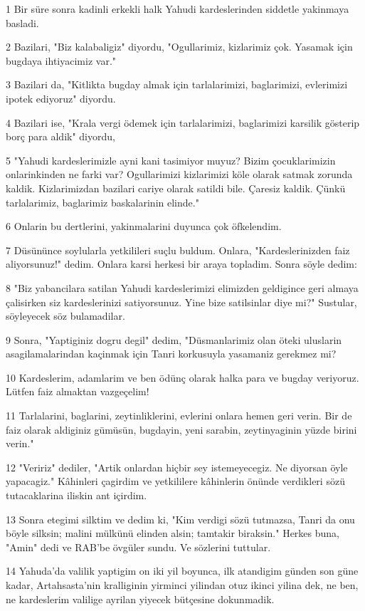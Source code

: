 \par 1 Bir süre sonra kadinli erkekli halk Yahudi kardeslerinden siddetle yakinmaya basladi.
\par 2 Bazilari, "Biz kalabaligiz" diyordu, "Ogullarimiz, kizlarimiz çok. Yasamak için bugdaya ihtiyacimiz var."
\par 3 Bazilari da, "Kitlikta bugday almak için tarlalarimizi, baglarimizi, evlerimizi ipotek ediyoruz" diyordu.
\par 4 Bazilari ise, "Krala vergi ödemek için tarlalarimizi, baglarimizi karsilik gösterip borç para aldik" diyordu,
\par 5 "Yahudi kardeslerimizle ayni kani tasimiyor muyuz? Bizim çocuklarimizin onlarinkinden ne farki var? Ogullarimizi kizlarimizi köle olarak satmak zorunda kaldik. Kizlarimizdan bazilari cariye olarak satildi bile. Çaresiz kaldik. Çünkü tarlalarimiz, baglarimiz baskalarinin elinde."
\par 6 Onlarin bu dertlerini, yakinmalarini duyunca çok öfkelendim.
\par 7 Düsününce soylularla yetkilileri suçlu buldum. Onlara, "Kardeslerinizden faiz aliyorsunuz!" dedim. Onlara karsi herkesi bir araya topladim. Sonra söyle dedim:
\par 8 "Biz yabancilara satilan Yahudi kardeslerimizi elimizden geldigince geri almaya çalisirken siz kardeslerinizi satiyorsunuz. Yine bize satilsinlar diye mi?" Sustular, söyleyecek söz bulamadilar.
\par 9 Sonra, "Yaptiginiz dogru degil" dedim, "Düsmanlarimiz olan öteki uluslarin asagilamalarindan kaçinmak için Tanri korkusuyla yasamaniz gerekmez mi?
\par 10 Kardeslerim, adamlarim ve ben ödünç olarak halka para ve bugday veriyoruz. Lütfen faiz almaktan vazgeçelim!
\par 11 Tarlalarini, baglarini, zeytinliklerini, evlerini onlara hemen geri verin. Bir de faiz olarak aldiginiz gümüsün, bugdayin, yeni sarabin, zeytinyaginin yüzde birini verin."
\par 12 "Veririz" dediler, "Artik onlardan hiçbir sey istemeyecegiz. Ne diyorsan öyle yapacagiz." Kâhinleri çagirdim ve yetkililere kâhinlerin önünde verdikleri sözü tutacaklarina iliskin ant içirdim.
\par 13 Sonra etegimi silktim ve dedim ki, "Kim verdigi sözü tutmazsa, Tanri da onu böyle silksin; malini mülkünü elinden alsin; tamtakir biraksin." Herkes buna, "Amin" dedi ve RAB'be övgüler sundu. Ve sözlerini tuttular.
\par 14 Yahuda'da valilik yaptigim on iki yil boyunca, ilk atandigim günden son güne kadar, Artahsasta'nin kralliginin yirminci yilindan otuz ikinci yilina dek, ne ben, ne kardeslerim valilige ayrilan yiyecek bütçesine dokunmadik.

